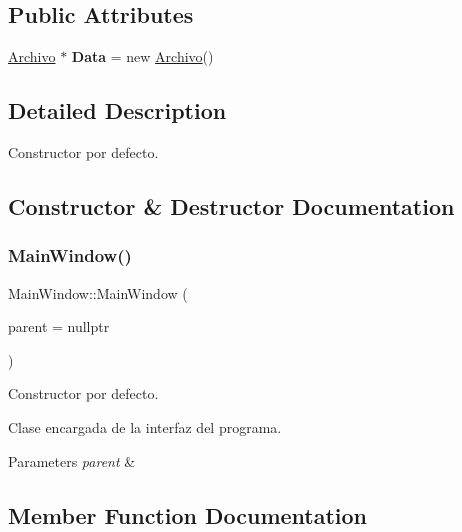 \subsection*{Public Attributes}
\begin{DoxyCompactItemize}
\item 
\mbox{\label{classMainWindow_aeff492ce824a4b80ff12129d27b3ced6}} 
\hyperlink{classArchivo}{Archivo} $\ast$ {\bfseries Data} = new \hyperlink{classArchivo}{Archivo}()
\end{DoxyCompactItemize}


\subsection{Detailed Description}
Constructor por defecto. 

\subsection{Constructor \& Destructor Documentation}
\mbox{\label{classMainWindow_a996c5a2b6f77944776856f08ec30858d}} 
\subsubsection{\texorpdfstring{Main\+Window()}{MainWindow()}}
{\footnotesize\ttfamily Main\+Window\+::\+Main\+Window (\begin{DoxyParamCaption}\item[{Q\+Widget $\ast$}]{parent = {\ttfamily nullptr} }\end{DoxyParamCaption})\hspace{0.3cm}{\ttfamily [explicit]}}



Constructor por defecto. 

Clase encargada de la interfaz del programa.


\begin{DoxyParams}{Parameters}
{\em parent} & \\
\hline
\end{DoxyParams}


\subsection{Member Function Documentation}
\mbox{\label{classMainWindow_a3b74d34ab10f6d5b766d2bf48ceb36cc}} 
